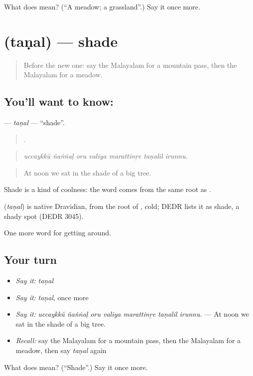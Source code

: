 \begin{tcolorbox}[breakable,colback=teal!4,colframe=teal!35!black,title={Before you move on}]
What does  mean? (\textquotedblleft{}A meadow; a grassland\textquotedblright{}.) Say it once more.
\end{tcolorbox}
\section[\texorpdfstring{\ml{തണൽ} (taṇal)}{തണൽ (taṇal)}]{ (taṇal) — shade}

\label{lesson:ML-C495-tanal}



\begin{quote}
Before the new one: say the Malayalam for a mountain pass, then the Malayalam for a meadow.
\end{quote}

\subsection*{You'll want to know: }
\textbf{} — \emph{taṇal} — \textquotedblleft{}shade\textquotedblright{}.

\begin{quote}
      .
\end{quote}

\begin{quote}
\emph{uccaykkŭ ñaṅṅaḷ oru valiya marattinṟe taṇalil irunnu.}
\end{quote}

\begin{quote}
At noon we sat in the shade of a big tree.
\end{quote}

Shade is a kind of coolness: the word comes from the same root as .

\begin{cousinweb}
\textbf{} (\emph{taṇal}) is native Dravidian, from the root of , cold; DEDR lists it as shade, a shady spot (DEDR 3045).
\end{cousinweb}

\begin{grammarlens}[title={What you've built}]
One more word for getting around.
\end{grammarlens}

\subsection*{Your turn}
\begin{itemize}
\raggedright
  \item \emph{Say it:} \emph{taṇal}
  \item \emph{Say it:} \emph{taṇal}, once more
  \item \emph{Say it:} \emph{uccaykkŭ ñaṅṅaḷ oru valiya marattinṟe taṇalil irunnu.} — At noon we sat in the shade of a big tree.
  \item \emph{Recall:} say the Malayalam for a mountain pass, then the Malayalam for a meadow, then say \emph{taṇal} again
\end{itemize}

\begin{tcolorbox}[breakable,colback=teal!4,colframe=teal!35!black,title={Before you move on}]
What does  mean? (\textquotedblleft{}Shade\textquotedblright{}.) Say it once more.
\end{tcolorbox}
